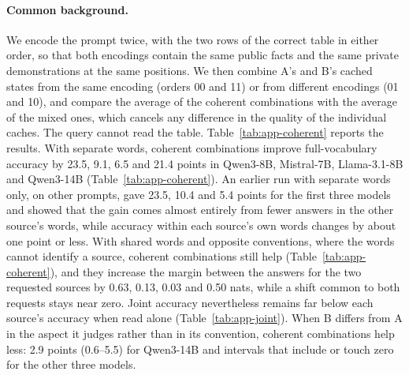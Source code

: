 \paragraph{Common background.}
We encode the prompt twice, with the two rows of the correct table in either order, so that both encodings contain the same public facts and the same private demonstrations at the same positions.
We then combine A's and B's cached states from the same encoding (orders 00 and 11) or from different encodings (01 and 10), and compare the average of the coherent combinations with the average of the mixed ones, which cancels any difference in the quality of the individual caches.
The query cannot read the table.
Table~\ref{tab:app-coherent} reports the results.
With separate words, coherent combinations improve full-vocabulary accuracy by 23.5, 9.1, 6.5 and 21.4 points in Qwen3-8B, Mistral-7B, Llama-3.1-8B and Qwen3-14B (Table~\ref{tab:app-coherent}). An earlier run with separate words only, on other prompts, gave 23.5, 10.4 and 5.4 points for the first three models and showed that the gain comes almost entirely from fewer answers in the other source's words, while accuracy within each source's own words changes by about one point or less.
With shared words and opposite conventions, where the words cannot identify a source, coherent combinations still help (Table~\ref{tab:app-coherent}), and they increase the margin between the answers for the two requested sources by 0.63, 0.13, 0.03 and 0.50 nats, while a shift common to both requests stays near zero.
Joint accuracy nevertheless remains far below each source's accuracy when read alone (Table~\ref{tab:app-joint}).
When B differs from A in the aspect it judges rather than in its convention, coherent combinations help less: 2.9 points (0.6--5.5) for Qwen3-14B and intervals that include or touch zero for the other three models.

\begin{table}[!ht]
\centering\small
\setlength{\tabcolsep}{2.5pt}
\caption{Coherent minus mixed combinations of independently encoded caches (points). Shared, opposite: shared words with conflicting conventions; all: both convention worlds.}
\label{tab:app-coherent}
\end{table}


